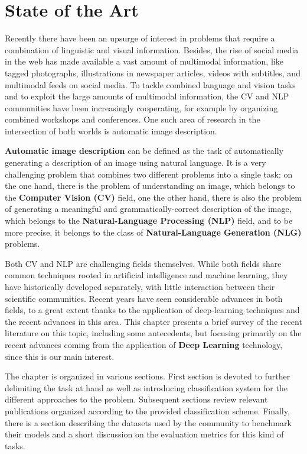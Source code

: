 \chapter{State of the Art}
\label{ch:state_of_the_art}

Recently there have been an upsurge of interest in problems that require a combination of linguistic and visual information. Besides, the rise of social media in the web has made available a vast amount of multimodal information, like tagged photographs, illustrations in newspaper articles, videos with subtitles, and multimodal feeds on social media. To tackle combined language and vision tasks and to exploit the large amounts of multimodal information, the CV and NLP communities have been increasingly cooperating, for example by organizing combined workshops and conferences. One such area of research in the intersection of both worlds is automatic image description.

\textbf{Automatic image description} can be defined as the task of automatically generating a description of an image using natural language. It is a very challenging problem that combines two different problems into a single task: on the one hand, there is the problem of understanding an image, which belongs to the \textbf{Computer Vision (CV)} field, one the other hand, there is also the problem of generating a meaningful and grammatically-correct description of the image, which belongs to the \textbf{Natural-Language Processing (NLP)} field, and to be more precise, it belongs to the class of \textbf{Natural-Language Generation (NLG)} problems.

Both CV and NLP are challenging fields themselves. While both fields share common techniques rooted in artificial intelligence and machine learning, they have historically developed separately, with little interaction between their scientific communities.  Recent years have seen considerable advances in both fields, to a great extent thanks to the application of deep-learning techniques and the recent advances in this area. This chapter presents a brief survey of the recent literature on this topic, including some antecedents, but focusing primarily on the recent advances coming from the application of \textbf{Deep Learning} technology, since this is our main interest.

The chapter is organized in various sections. First section is devoted to further delimiting the task at hand as well as introducing classification system for the different approaches to the problem. Subsequent sections review relevant publications organized according to the provided classification scheme. Finally, there is a section describing the datasets used by the community to benchmark their models and a short discussion on the evaluation metrics for this kind of tasks.

